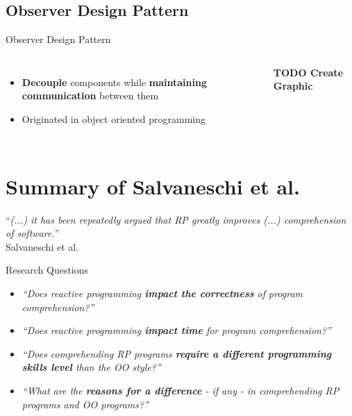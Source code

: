 \documentclass{beamer}
\begin{document}
\subsection*{Observer Design Pattern}
\begin{frame}{Observer Design Pattern \cite{gamma1995design}}
	\begin{columns}[t, onlytextwidth]
			\begin{itemize}
				\item \textbf{Decouple} components while \textbf{maintaining communication} between them\bigskip
				\item Originated in object oriented programming\bigskip
			\end{itemize}

			\textbf{TODO Create Graphic}
	\end{columns}
\end{frame}



\section{Summary of Salvaneschi et al.}

\begin{frame}[focus]
	``\emph{(...) it has been repeatedly argued that RP greatly improves (...) comprehension of software.}''
	\\\bigskip
	\small{Salvaneschi et al. \cite{7827078}}
\end{frame}

\begin{frame}{Research Questions \cite{7827078}}
	\begin{itemize}
		\item \emph{``Does reactive programming \textbf{impact the correctness} of program comprehension?''}\bigskip
		\item \emph{``Does reactive programming \textbf{impact time} for program comprehension?''}\bigskip
		\item \emph{``Does comprehending RP programs \textbf{require a different programming skills level} than the OO style?''}\bigskip
		\item \emph{``What are the \textbf{reasons for a difference} - if any - in comprehending RP programs and OO programs?''}
	\end{itemize}
\end{frame}
\end{document}
